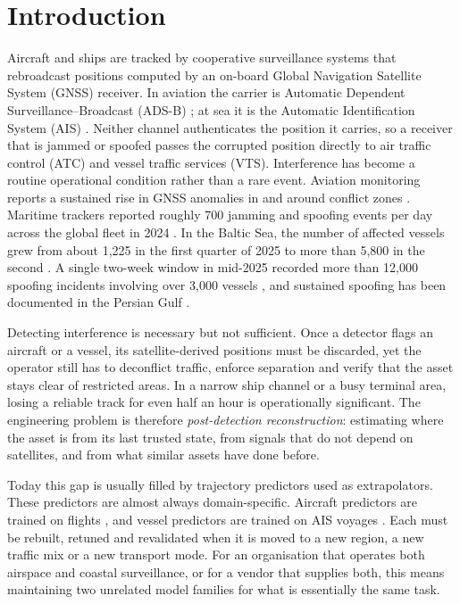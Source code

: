 \section{Introduction}
\label{sec:intro}

Aircraft and ships are tracked by cooperative surveillance systems that
rebroadcast positions computed by an on-board Global Navigation Satellite
System (GNSS) receiver. In aviation the carrier is Automatic Dependent
Surveillance--Broadcast (ADS-B) \citep{faa2007adsb,khan2025adsbsurvey}; at sea
it is the Automatic Identification System (AIS) \citep{itu2014ais}. Neither
channel authenticates the position it carries, so a receiver that is jammed
or spoofed passes the corrupted position directly to air traffic control
(ATC) and vessel traffic services (VTS). Interference has become a routine
operational condition rather than a rare event. Aviation monitoring reports a
sustained rise in GNSS anomalies in and around conflict zones
\citep{aireon2025,felux2025navigating,ieropoulos2024impact,lo2025observations}.
Maritime trackers reported roughly 700 jamming and spoofing events per day
across the global fleet in 2024 \citep{windward2025}. In the Baltic Sea, the
number of affected vessels grew from about 1,225 in the first quarter of 2025
to more than 5,800 in the second \citep{gpspatron2025}. A single two-week
window in mid-2025 recorded more than 12,000 spoofing incidents involving
over 3,000 vessels \citep{kpler2025}, and sustained spoofing has been
documented in the Persian Gulf \citep{skuld2025,maritimeexec2025}.

Detecting interference is necessary but not sufficient. Once a detector
flags an aircraft or a vessel, its satellite-derived positions must be
discarded, yet the operator still has to deconflict traffic, enforce
separation and verify that the asset stays clear of restricted areas. In a
narrow ship channel or a busy terminal area, losing a reliable track for
even half an hour is operationally significant. The engineering problem is
therefore \emph{post-detection reconstruction}: estimating where the asset is
from its last trusted state, from signals that do not depend on satellites,
and from what similar assets have done before.

Today this gap is usually filled by trajectory predictors used as
extrapolators. These predictors are almost always domain-specific. Aircraft
predictors are trained on flights \citep{pang2019lstm,kwak2025evolution}, and
vessel predictors are trained on AIS voyages
\citep{li2023ship,shin2024aisacnet,nguyen2024transformer}. Each must be
rebuilt, retuned and revalidated when it is moved to a new region, a new
traffic mix or a new transport mode. For an organisation that operates both
airspace and coastal surveillance, or for a vendor that supplies both, this
means maintaining two unrelated model families for what is essentially the
same task.

